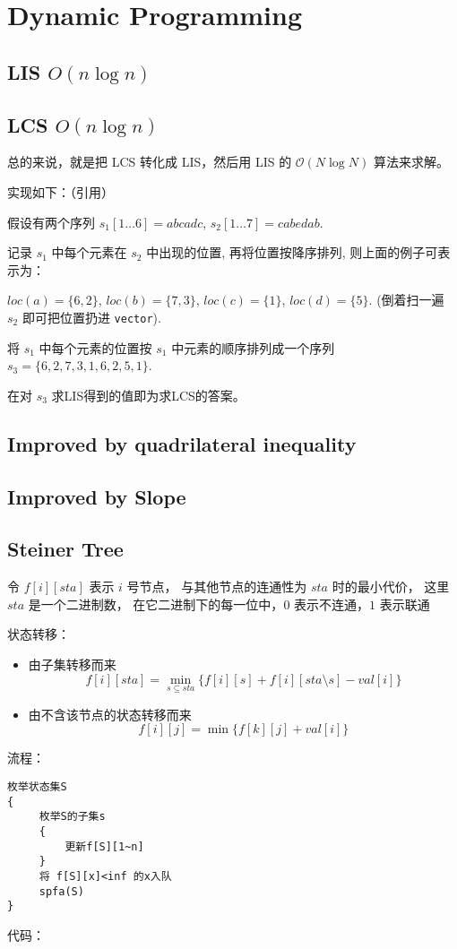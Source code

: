 \section{Dynamic Programming}

\subsection{LIS $O(n\log{n})$}


\subsection{LCS $O(n\log{n})$}

总的来说，就是把 LCS 转化成 LIS，然后用 LIS 的 $\mathcal{O}(N\log{N})$ 算法来求解。

实现如下：（引用）

假设有两个序列 $s_1[1\dots{6}] = abcadc$, $s_2[1\dots{7}] = cabedab$.

记录 $s_1$ 中每个元素在 $s_2$ 中出现的位置, 再将位置按降序排列, 则上面的例子可表示为：

$loc(a) = \{ 6, 2 \}$,
$loc( b ) = \{ 7, 3 \}$,
$loc( c ) = \{ 1 \}$, 
$loc( d ) = \{ 5 \}$.
(倒着扫一遍 $s_2$ 即可把位置扔进 \verb|vector|).

将 $s_1$ 中每个元素的位置按 $s_1$ 中元素的顺序排列成一个序列
$s_3 = \{ 6, 2, 7, 3, 1, 6, 2, 5, 1 \}$.

在对 $s_3$ 求LIS得到的值即为求LCS的答案。


\subsection{Improved by quadrilateral inequality}


\subsection{Improved by Slope}


\subsection{Steiner Tree}
令 $f[i][sta]$ 表示 $i$ 号节点，
与其他节点的连通性为 $sta$ 时的最小代价，
这里 $sta$ 是一个二进制数，
在它二进制下的每一位中，$0$ 表示不连通，$1$ 表示联通

状态转移：
\begin{itemize}
    \item 由子集转移而来
    \[
        f[i][sta] = \min_{s \subseteq sta}\{f[i][s] + f[i][sta \setminus s] - val[i]\}
    \]
    \item 由不含该节点的状态转移而来
    \[
        f[i][j] = \min\{f[k][j] + val[i]\}
    \]
\end{itemize}

流程：
\begin{lstlisting}
枚举状态集S 
{ 
     枚举S的子集s 
     { 
         更新f[S][1~n] 
     } 
     将 f[S][x]<inf 的x入队 
     spfa(S) 
}
\end{lstlisting}

代码：

